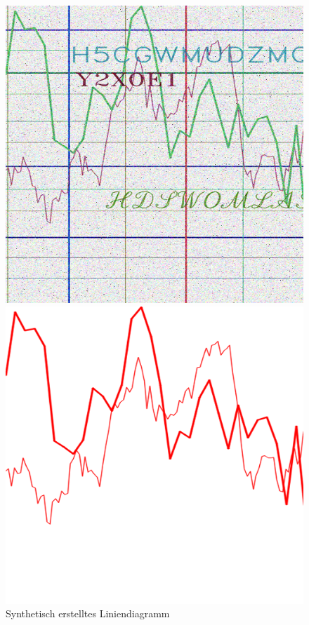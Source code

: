 \begin{figure}[H] %
    \centering
    \begin{minipage}{0.475\textwidth} %
        \centering
        \includegraphics[width=\linewidth]{Methodik/img/lines_synthetic.png}
        \caption{ Synthetisch erstelltes Liniendiagramm}
        \label{fig:lines_synthetic}
    \end{minipage}\hfill %
    \begin{minipage}{0.475\textwidth} %
        \centering
        \includegraphics[width=\linewidth]{Methodik/img/lines_synthetic_mask.png}

\end{minipage}
\end{figure}
